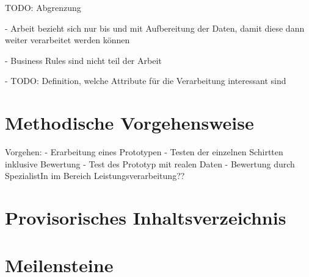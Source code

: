 \documentclass{article}
\begin{document}
TODO: Abgrenzung

- Arbeit bezieht sich nur bis und mit Aufbereitung der Daten, damit diese dann weiter verarbeitet werden können

- Business Rules sind nicht teil der Arbeit

- TODO: Definition, welche Attribute für die Verarbeitung interessant sind

\section{Methodische Vorgehensweise}

 
Vorgehen:
- Erarbeitung eines Prototypen
- Testen der einzelnen Schirtten inklusive Bewertung
- Test des Prototyp mit realen Daten
- Bewertung durch SpezialistIn im Bereich Leistungsverarbeitung??
 
\section{Provisorisches Inhaltsverzeichnis} 


\section{Meilensteine}

\end{document}
